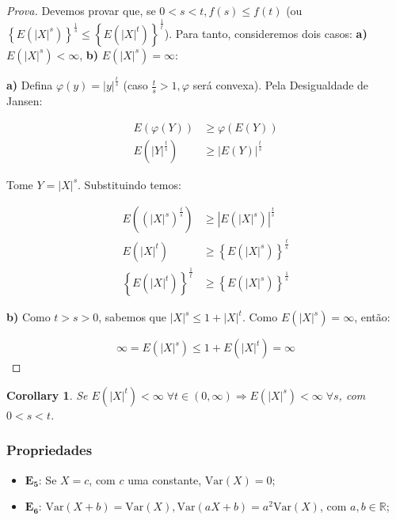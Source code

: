 \documentclass[
]{article}
\providecommand{\tightlist}{%
  \setlength{\itemsep}{0pt}\setlength{\parskip}{0pt}}
\newtheorem{corollary}{Corollary}[section]
\theoremstyle{definition}
\theoremstyle{definition}
\theoremstyle{definition}
\theoremstyle{definition}
\theoremstyle{remark}
\begin{document}
\begin{proof}[Prova]
Devemos provar que, se \(0 < s < t, f(s) \le f(t)\) (ou \(\left\{E(|X|^{s})\right\}^{\frac{1}{s}} \le \left\{E(|X|^{t})\right\}^{\frac{1}{t}}\)). Para tanto, consideremos dois casos: \textbf{a)} \(E(|X|^{s})<\infty\), \textbf{b)} \(E(|X|^{s})=\infty\):

\textbf{a)} Defina \(\varphi(y) = |y|^{\frac{t}{s}}\) (caso \(\frac{t}{s} > 1, \varphi\) será convexa). Pela Desigualdade de Jansen:

\begin{align*}
E(\varphi(Y)) &\ge \varphi(E(Y)) \\
E\left(|Y|^{\frac{t}{s}}\right) &\ge \left|E(Y)\right|^{\frac{t}{s}}
\end{align*}

Tome \(Y = |X|^{s}\). Substituindo temos:

\begin{align*}
E\left((|X|^{s})^{\frac{t}{s}}\right) &\ge \left|E(|X|^{s})\right|^{\frac{t}{s}} \\
E\left(|X|^{t}\right) &\ge \left\{E(|X|^{s})\right\}^{\frac{t}{s}} \\
\left\{E(|X|^{t})\right\}^{\frac{1}{t}} &\ge \left\{E(|X|^{s})\right\}^{\frac{1}{s}}
\end{align*}

\textbf{b)} Como \(t > s > 0\), sabemos que \(|X|^{s} \le 1 + |X|^{t}\). Como \(E(|X|^{s}) = \infty\), então:

\begin{equation*}
\infty = E(|X|^{s}) \le 1 + E(|X|^{t}) = \infty
\end{equation*}
\end{proof}

\begin{corollary}
Se \(E(|X|^{t}) < \infty \; \forall t \in (0,\infty) \Rightarrow E(|X|^{s}) < \infty \; \forall s\), com \(0 < s < t\).
\end{corollary}

\hypertarget{propriedades-1}{%
\subsubsection{Propriedades}\label{propriedades-1}}

\begin{itemize}
\tightlist
\item
  \(\mathbf{E_{5}}\): Se \(X = c\), com \(c\) uma constante, \(\mathrm{Var}(X) = 0\);
\item
  \(\mathbf{E_{6}}\): \(\mathrm{Var}(X+b) = \mathrm{Var}(X), \mathrm{Var}(aX + b) = a^{2}\mathrm{Var}(X)\), com \(a,b \in \mathbb{R}\);
\end{itemize}
\end{document}
